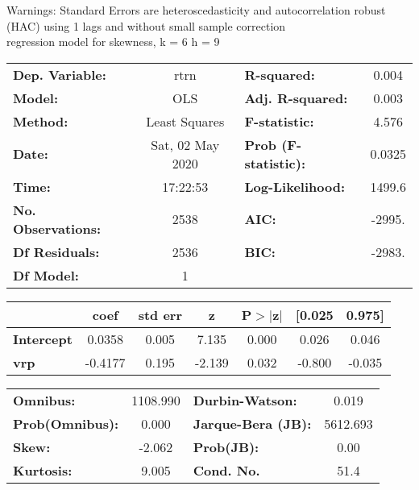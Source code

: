 Warnings: \newline
 [1] Standard Errors are heteroscedasticity and autocorrelation robust (HAC) using 1 lags and without small sample correction\\ 

regression model for skewness, k = 6 h = 9\begin{center}
\begin{tabular}{lclc}
\toprule
\textbf{Dep. Variable:}    &       rtrn       & \textbf{  R-squared:         } &     0.004   \\
\textbf{Model:}            &       OLS        & \textbf{  Adj. R-squared:    } &     0.003   \\
\textbf{Method:}           &  Least Squares   & \textbf{  F-statistic:       } &     4.576   \\
\textbf{Date:}             & Sat, 02 May 2020 & \textbf{  Prob (F-statistic):} &   0.0325    \\
\textbf{Time:}             &     17:22:53     & \textbf{  Log-Likelihood:    } &    1499.6   \\
\textbf{No. Observations:} &        2538      & \textbf{  AIC:               } &    -2995.   \\
\textbf{Df Residuals:}     &        2536      & \textbf{  BIC:               } &    -2983.   \\
\textbf{Df Model:}         &           1      & \textbf{                     } &             \\
\bottomrule
\end{tabular}
\begin{tabular}{lcccccc}
                   & \textbf{coef} & \textbf{std err} & \textbf{z} & \textbf{P$> |$z$|$} & \textbf{[0.025} & \textbf{0.975]}  \\
\midrule
\textbf{Intercept} &       0.0358  &        0.005     &     7.135  &         0.000        &        0.026    &        0.046     \\
\textbf{vrp}       &      -0.4177  &        0.195     &    -2.139  &         0.032        &       -0.800    &       -0.035     \\
\bottomrule
\end{tabular}
\begin{tabular}{lclc}
\textbf{Omnibus:}       & 1108.990 & \textbf{  Durbin-Watson:     } &    0.019  \\
\textbf{Prob(Omnibus):} &   0.000  & \textbf{  Jarque-Bera (JB):  } & 5612.693  \\
\textbf{Skew:}          &  -2.062  & \textbf{  Prob(JB):          } &     0.00  \\
\textbf{Kurtosis:}      &   9.005  & \textbf{  Cond. No.          } &     51.4  \\
\bottomrule
\end{tabular}
\end{center}

